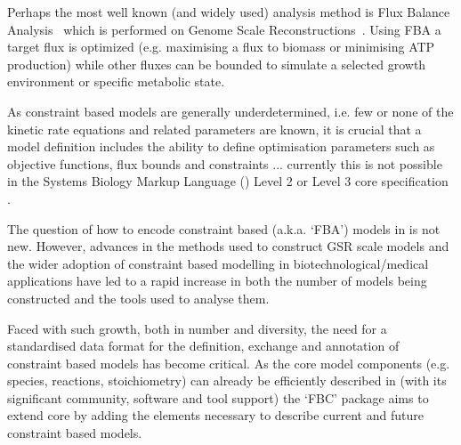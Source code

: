 Perhaps the most well known (and widely used) analysis method is Flux Balance Analysis~\citep[FBA; ][]{orth_2010} which is performed on Genome Scale Reconstructions~\citep[GSR's; ][]{oberhardt_2009}. Using FBA a target flux is optimized (e.g. maximising a flux to biomass or minimising ATP production) while other fluxes can be bounded to simulate a selected growth environment or specific metabolic state.

As constraint based models are generally underdetermined, i.e. few or none of the kinetic rate equations and related parameters are known, it is crucial that a model definition includes the ability to define optimisation parameters such as objective functions, flux bounds and constraints ... currently this is not possible in the Systems Biology Markup Language (\SBML) Level 2 or Level 3 core specification \citep{sbml, sbml3core}.

The question of how to encode constraint based (a.k.a. `FBA') models in \SBML is not new. However, advances in the methods used to construct GSR scale models and the wider adoption of constraint based modelling in biotechnological/medical applications have led to a rapid increase in both the number of models being constructed and the tools used to analyse them.

Faced with such growth, both in number and diversity, the need for a standardised data format for the definition, exchange and annotation of constraint based models has become critical. As the core model components (e.g. species, reactions, stoichiometry) can already be efficiently described in \SBML (with its significant community, software and tool support) the `FBC' package aims to extend \SBML core by adding the elements necessary to describe current and future constraint based models.
